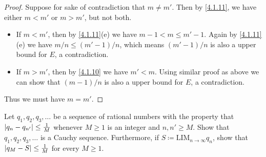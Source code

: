 \begin{proof}
  Suppose for sake of contradiction that \(m \neq m'\).
  Then by \cref{4.1.11}, we have either \(m < m'\) or \(m > m'\), but not both.
  \begin{itemize}
    \item If \(m < m'\), then by \cref{4.1.11}(e) we have \(m - 1 < m \leq m' - 1\).
          Again by \cref{4.1.11}(e) we have \(m / n \leq (m' - 1) / n\), which means \((m' - 1) / n\) is also a upper bound for \(E\), a contradiction.
    \item If \(m > m'\), then by \cref{4.1.10} we have \(m' < m\).
          Using similar proof as above we can show that \((m - 1) / n\) is also a upper bound for \(E\), a contradiction.
  \end{itemize}
  Thus we must have \(m = m'\).
\end{proof}

\begin{ex}\label{ex:5.5.4}
  Let \(q_1, q_2, q_3, \dots\) be a sequence of rational numbers with the property that \(\left\lvert q_n - q_{n'}\right\rvert \leq \frac{1}{M}\) whenever \(M \geq 1\) is an integer and \(n, n' \geq M\).
  Show that \(q_1, q_2, q_3, \dots\) is a Cauchy sequence.
  Furthermore, if \(S \coloneqq \text{LIM}_{n \to \infty} q_n\), show that \(\left\lvert q_M - S\right\rvert \leq \frac{1}{M}\) for every \(M \geq 1\).
\end{ex}

